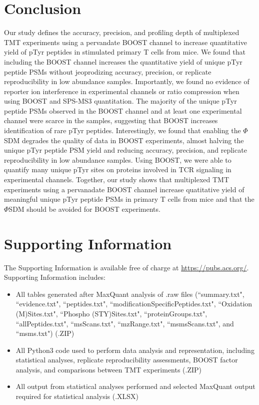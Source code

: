 \documentclass[journal=jprobs,manuscript=article]{achemso}
\begin{document}
\section{Conclusion}

Our study defines the accuracy, precision, and profiling depth of multiplexed TMT experiments using a pervandate BOOST channel to increase quantitative yield of pTyr peptides in stimulated primary T cells from mice. We found that including the BOOST channel increases the quantitative yield of unique pTyr peptide PSMs without jeoprodizing accuracy, precision, or replicate reproducibility in low abundance samples. Importantly, we found no evidence of reporter ion interference in experimental channels or ratio compression when using BOOST and SPS-MS3 quantitation. The majority of the unique pTyr peptide PSMs observed in the BOOST channel and at least one experimental channel were scarce in the samples, suggesting that BOOST increases identification of rare pTyr peptides. Interestingly, we found that enabling the $\Phi$SDM degrades the quality of data in BOOST experiments, almost halving the unique pTyr peptide PSM yield and reducing accuracy, precision, and replicate reproducibility in low abundance samples. Using BOOST, we were able to quantify many unique pTyr sites on proteins involved in TCR signaling in experimental channels. Together, our study shows that multiplexed TMT experiments using a pervanadate BOOST channel increase quatitative yield of meaningful unique pTyr peptide PSMs in primary T cells from mice and that the $\Phi$SDM should be avoided for BOOST experiments.

\section{Supporting Information}

The Supporting Information is available free of charge at \href{https://pubs.acs.org/}{https://pubs.acs.org/}. Supporting Information includes:

\begin{itemize}
    \item {All tables generated after MaxQuant analysis of .raw files (``summary.txt", ``evidence.txt", ``peptides.txt", ``modificationSpecificPeptides.txt", ``Oxidation (M)Sites.txt", ``Phospho (STY)Sites.txt", ``proteinGroups.txt", ``allPeptides.txt", ``msScans.txt", ``mzRange.txt", ``msmsScans.txt",  and ``msms.txt") (.ZIP)}
    \item {All Python3 code used to perform data analysis and representation, including statistical analyses, replicate reproducibility assessments, BOOST factor analysis, and comparisons between TMT experiments (.ZIP)}
    \item {All output from statistical analyses performed and selected MaxQuant output required for statistical analysis (.XLSX)}
\end{itemize}
\end{document}
